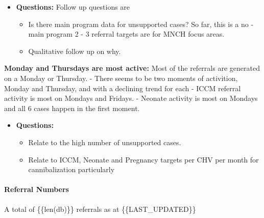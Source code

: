 \documentclass[11pt]{article}
\providecommand{\tightlist}{%
      \setlength{\itemsep}{0pt}\setlength{\parskip}{0pt}}
\begin{document}
\begin{itemize}
\tightlist
\item
  \textbf{Questions:} Follow up questions are

  \begin{itemize}
  \tightlist
  \item
    Is there main program data for unsupported cases? So far, this is a
    no - main program 2 - 3 referral targets are for MNCH focus areas.
  \item
    Qualitative follow up on why.
  \end{itemize}
\end{itemize}

\textbf{Monday and Thursdays are most active:} Most of the referrals are
generated on a Monday or Thursday. - There seems to be two moments of
activition, Monday and Thursday, and with a declining trend for each -
ICCM referral activity is most on Mondays and Fridays. - Neonate
activity is most on Mondays and all 6 cases happen in the first moment.

\begin{itemize}
\tightlist
\item
  \textbf{Questions:}

  \begin{itemize}
  \tightlist
  \item
    Relate to the high number of unsupported cases.
  \item
    Relate to ICCM, Neonate and Pregnancy targets per CHV per month for
    cannibalization particularly
  \end{itemize}
\end{itemize}

    \paragraph{Referral Numbers}\label{referral-numbers}

A total of \{\{len(db)\}\} referrals as at \{\{LAST\_UPDATED\}\}
\end{document}
